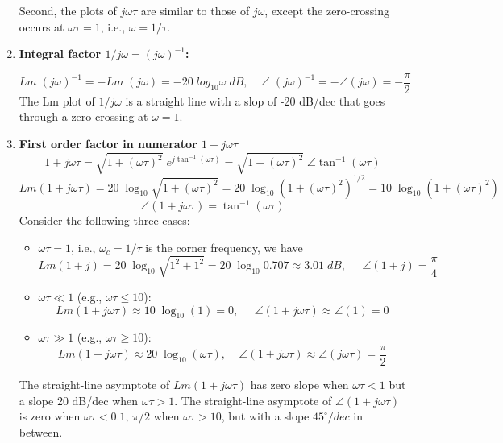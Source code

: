 \documentclass{article}
\begin{document}
\begin{enumerate}
  Second, the plots of $j\omega\tau$ are similar to those of $j\omega$, except the
  zero-crossing occurs at $\omega\tau=1$, i.e., $\omega=1/\tau$.

\item {\bf Integral factor $1/j\omega=(j\omega)^{-1}$:}

  \begin{equation} Lm \;(j\omega)^{-1}=-Lm\;(j\omega)=-20\;log_{10} \omega\;dB,
  \;\;\;\;\angle\; (j\omega)^{-1}=-\angle(j\omega)=-\frac{\pi}{2} \end{equation}
  The Lm plot of $1/j\omega$ is a straight line with a slop of -20 dB/dec that goes
  through a zero-crossing at $\omega=1$.

\item {\bf First order factor in numerator $1+j\omega\tau$}
  \begin{equation} 1+j\omega \tau=\sqrt{1+(\omega \tau)^2}\;e^{j\tan^{-1}(\omega \tau)}
  =\sqrt{1+(\omega \tau)^2}\;\angle \tan^{-1}(\omega \tau) \end{equation}
  \begin{equation} Lm(1+j\omega \tau)=20\;\log_{10}\sqrt{1+(\omega \tau)^2}
  =20\;\log_{10}(1+(\omega \tau)^2)^{1/2}=10\;\log_{10}(1+(\omega \tau)^2) \end{equation}
  \begin{equation} \angle(1+j\omega \tau)=\tan^{-1}(\omega\tau) \end{equation}
  Consider the following three cases:
  \begin{itemize}
  \item $\omega\tau=1$, i.e., $\omega_c=1/\tau$ is the corner frequency, we have
    \begin{equation} Lm(1+j)=20\;\log_{10} \sqrt{1^2+1^2}=20\;\log_{10} 0.707\approx 3.01\;dB,\;\;\;\;\;
    \angle(1+j)=\frac{\pi}{4} \end{equation}
  \item $\omega\tau \ll 1$ (e.g., $\omega\tau\le 10$):
    \begin{equation} Lm(1+j\omega \tau)\approx10\;\log_{10}(1)=0,\;\;\;\;\;
    \angle(1+j\omega \tau)\approx \angle(1)=0 \end{equation}
  \item $\omega\tau \gg 1$ (e.g., $\omega\tau\ge 10$):
    \begin{equation} Lm(1+j\omega \tau)\approx 20\;\log_{10}(\omega \tau),\;\;\;\;
    \angle(1+j\omega \tau)\approx \angle(j\omega \tau)=\frac{\pi}{2} \end{equation}
  \end{itemize}
  The straight-line asymptote of $Lm(1+j\omega\tau)$ has zero slope when $\omega\tau<1$
  but a slope 20 dB/dec when $\omega\tau>1$. The straight-line asymptote of 
  $\angle(1+j\omega\tau)$ is zero when $\omega\tau<0.1$, $\pi/2$ when $\omega\tau>10$, 
  but with a slope $45^\circ/dec$ in between.


\end{enumerate}
\end{document}
